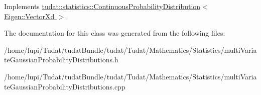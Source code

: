 Implements \hyperlink{classtudat_1_1statistics_1_1ContinuousProbabilityDistribution_a7edfe6753ce63fe4e12409d3fb88e499}{tudat\+::statistics\+::\+Continuous\+Probability\+Distribution$<$ Eigen\+::\+Vector\+Xd $>$}.



The documentation for this class was generated from the following files\+:\begin{DoxyCompactItemize}
\item 
/home/lupi/\+Tudat/tudat\+Bundle/tudat/\+Tudat/\+Mathematics/\+Statistics/multi\+Variate\+Gaussian\+Probability\+Distributions.\+h\item 
/home/lupi/\+Tudat/tudat\+Bundle/tudat/\+Tudat/\+Mathematics/\+Statistics/multi\+Variate\+Gaussian\+Probability\+Distributions.\+cpp\end{DoxyCompactItemize}
